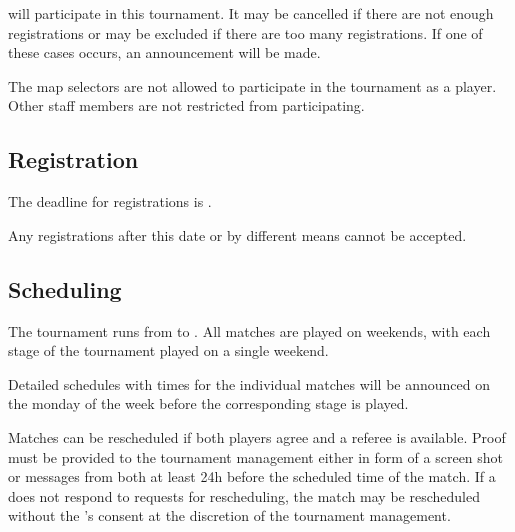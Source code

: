 \numparticipants{}  will participate in this tournament. It may be cancelled if there are not enough registrations or  may be excluded if there are too many registrations. If one of these cases occurs, an announcement will be made.

The map selectors are not allowed to participate in the tournament as a player. Other staff members are not restricted from participating.

\begin{samepage}
\subsection{Registration}

\end{samepage}

The deadline for registrations is \regend.

Any registrations after this date or by different means cannot be accepted.

\customreg

\subsection{Scheduling}

The tournament runs from \tournamentstart{} to \tournamentend. All matches are played on weekends, with each stage of the tournament played on a single weekend.

Detailed schedules with times for the individual matches will be announced on the monday of the week before the corresponding stage is played.

Matches can be rescheduled if both players agree and a referee is available. Proof must be provided to the tournament management either in form of a screen shot or messages from both  at least 24h before the scheduled time of the match.
If a  does not respond to requests for rescheduling, the match may be rescheduled without the 's consent at the discretion of the tournament management.


